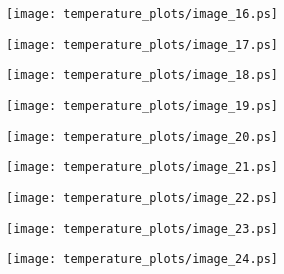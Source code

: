 \documentclass[11pt]{amsart}
\theoremstyle{plain}%
\theoremstyle{definition}
\theoremstyle{remark}
\numberwithin{equation}{thm}
\begin{document}
\begin{figure}[H]
\begin{center}
\texttt{[image: temperature\_plots/image\_16.ps]} 
\end{center}
\end{figure}

\begin{figure}[H]
\begin{center}
\texttt{[image: temperature\_plots/image\_17.ps]} 
\end{center}
\end{figure}

\begin{figure}[H]
\begin{center}
\texttt{[image: temperature\_plots/image\_18.ps]} 
\end{center}
\end{figure}

\begin{figure}[H]
\begin{center}
\texttt{[image: temperature\_plots/image\_19.ps]} 
\end{center}
\end{figure}

\begin{figure}[H]
\begin{center}
\texttt{[image: temperature\_plots/image\_20.ps]} 
\end{center}
\end{figure}

\begin{figure}[H]
\begin{center}
\texttt{[image: temperature\_plots/image\_21.ps]} 
\end{center}
\end{figure}

\begin{figure}[H]
\begin{center}
\texttt{[image: temperature\_plots/image\_22.ps]} 
\end{center}
\end{figure}

\begin{figure}[H]
\begin{center}
\texttt{[image: temperature\_plots/image\_23.ps]} 
\end{center}
\end{figure}

\begin{figure}[H]
\begin{center}
\texttt{[image: temperature\_plots/image\_24.ps]} 
\end{center}
\end{figure}
\end{document}
